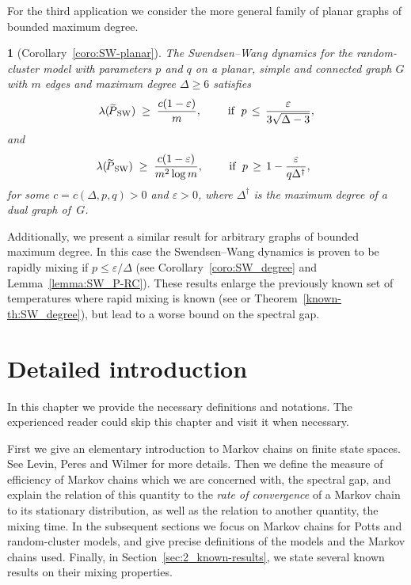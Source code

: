 \documentclass{dis}
\theoremstyle{citing}
\newtheorem{cit}{}
\begin{document}
For the third application we consider 
the more general family of 
planar graphs of bounded maximum degree.

\begin{cit}[Corollary~\ref{coro:SW-planar}]
The Swendsen--Wang dynamics for the random-cluster model
with parameters $p$ and $q$
on a planar, simple and connected graph $G$ with $m$ edges 
and maximum degree ${\Delta}\ge6$ satisfies
\[
\lambda({{\raisebox{2pt}{ ${\widetilde{{}}}$ }\mkern-14mu P}_{\rm SW}})\;\ge\;\frac{c(1-{\varepsilon})}{m}, \qquad \text{ if }\; 
p \,\le\, \frac{\varepsilon}{3\sqrt{{\Delta}-3}},
\vspace{-3mm}
\] 
and 
\[
\lambda({{\raisebox{2pt}{ ${\widetilde{{}}}$ }\mkern-14mu P}_{\rm SW}})\;\ge\;\frac{c(1-{\varepsilon})}{m^2 \log m}, \qquad 
\text{ if }\; 
p \,\ge\, 1- \frac{\varepsilon}{q {\Delta}^\dag}, \;\;
\] 
for some $c=c({\Delta},p,q)>0$ and ${\varepsilon}>0$, 
where ${\Delta}^\dag$ is the maximum degree of a dual graph of~$G$.
\vspace{1mm}
\end{cit}

Additionally, we present a similar result for arbitrary 
graphs of bounded maximum degree. 
In this case the Swendsen--Wang dynamics is proven to be rapidly 
mixing if $p\le{\varepsilon}/{\Delta}$ (see Corollary~\ref{coro:SW_degree} 
and Lemma~\ref{lemma:SW_P-RC}).
These results enlarge the previously known set of temperatures 
where rapid mixing is known (see \cite{Hu} or 
Theorem~\ref{known-th:SW_degree}), but lead to a worse bound on 
the spectral gap.

\chapter{Detailed introduction}

In this chapter we provide the necessary definitions and notations. 
The experienced reader could 
skip this chapter and visit it when necessary.

First we give an elementary introduction to 
Markov chains on finite state spaces. 
See Levin, Peres and Wilmer \cite{LPW} for more details.
Then we define the measure of efficiency of 
Markov chains which we are concerned with, the spectral gap, 
and explain the relation of this quantity to the 
\emph{rate of convergence} of a Markov chain to its stationary 
distribution, as well as the relation to another quantity, 
the mixing time.
In the subsequent sections we focus on 
Markov chains for Potts and random-cluster 
models, and give precise definitions of the models and the  
Markov chains used.
Finally, in Section~\ref{sec:2_known-results}, 
we state several known results on their 
mixing properties. 
\end{document}
